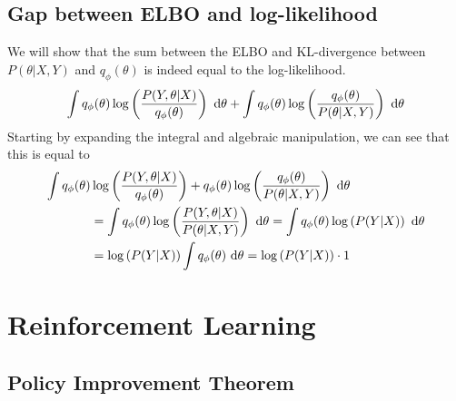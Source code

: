 \subsection{Gap between ELBO and log-likelihood}
\label{appendix-1:elbo-gap}
We will show that the sum between the ELBO and KL-divergence between $P(\theta | X, Y)$ and $q_{\phi}(\theta)$ is indeed equal to the log-likelihood.
\begin{equation*}
    \int q_{\phi}(\theta) \log\left(\frac{P(Y, \theta | X)}{q_{\phi}(\theta)}\right) \ \mathrm{d} \theta + \int q_{\phi} (\theta) \log\left( \frac{q_{\phi} (\theta)}{P(\theta | X, Y)} \right) \ \mathrm{d} \theta
\end{equation*}
Starting by expanding the integral and algebraic manipulation, we can see that this is equal to \begin{equation*}
    \begin{aligned}
        \int q_{\phi}(\theta) &\log\left(\frac{P(Y, \theta | X)}{q_{\phi}(\theta)}\right) +  q_{\phi} (\theta) \log\left( \frac{q_{\phi} (\theta)}{P(\theta | X, Y)} \right) \ \mathrm{d} \theta   \\ 
        &= \int q_{\phi}(\theta) \log\left( \frac{P(Y, \theta | X)}{P(\theta | X, Y)} \right) \ \mathrm{d} \theta = \int q_{\phi}(\theta) \log\left( P(Y | X) \right) \ \mathrm{d} \theta \\
        &= \log\left( P(Y | X) \right) \int q_{\phi}(\theta) \ \mathrm{d} \theta = \log\left( P(Y | X) \right) \cdot 1
    \end{aligned}
\end{equation*}

\section{Reinforcement Learning}

\subsection{Policy Improvement Theorem}
\label{appendix-2:policy-im}

